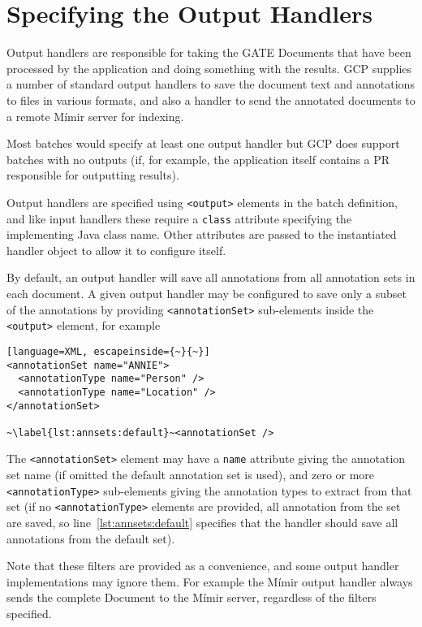 \section{Specifying the Output Handlers}

Output handlers are responsible for taking the GATE Documents that have been
processed by the application and doing something with the results.  GCP
supplies a number of standard output handlers to save the document text and
annotations to files in various formats, and also a handler to send the
annotated documents to a remote M\'{i}mir server for indexing.

Most batches would specify at least one output handler but GCP does support
batches with no outputs (if, for example, the application itself contains a PR
responsible for outputting results).

Output handlers are specified using \verb!<output>! elements in the batch
definition, and like input handlers these require a \verb!class! attribute
specifying the implementing Java class name.  Other attributes are passed to
the instantiated handler object to allow it to configure itself.

By default, an output handler will save all annotations from all annotation
sets in each document.  A given output handler may be configured to save only a
subset of the annotations by providing \verb!<annotationSet>! sub-elements
inside the \verb!<output>! element, for example

\begin{lstlisting}[language=XML, escapeinside={~}{~}]
<annotationSet name="ANNIE">
  <annotationType name="Person" />
  <annotationType name="Location" />
</annotationSet>

~\label{lst:annsets:default}~<annotationSet />
\end{lstlisting}

The \verb!<annotationSet>! element may have a \verb!name! attribute giving the
annotation set name (if omitted the default annotation set is used), and zero
or more \verb!<annotationType>! sub-elements giving the annotation types to
extract from that set (if no \verb!<annotationType>! elements are provided, all
annotation from the set are saved, so line~\ref{lst:annsets:default} specifies
that the handler should save all annotations from the default set).

Note that these filters are provided as a convenience, and some output handler
implementations may ignore them.  For example the M\'{i}mir output handler
always sends the complete Document to the M\'{i}mir server, regardless of the
filters specified.


